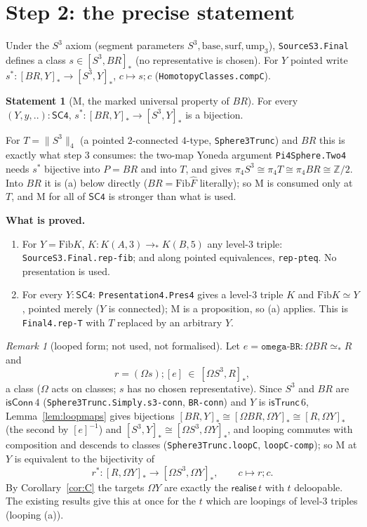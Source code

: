 \documentclass[11pt]{amsart}
\theoremstyle{definition}
\newtheorem{statement}[theorem]{Statement}
\theoremstyle{remark}
\newtheorem{remark}[theorem]{Remark}
\newcommand{\Om}{\Omega}
\newcommand{\code}[1]{\texttt{#1}}
\newcommand{\cT}{\mathsf{isTrunc}}
\newcommand{\cC}{\mathsf{isConn}}
\newcommand{\Fib}{\mathrm{Fib}}
\newcommand{\tr}[1]{\|#1\|}
\newcommand{\SCf}{\mathsf{SC4}}
\newcommand{\real}{\mathsf{realise}}
\newcommand{\pteq}{\simeq_*}
\newcommand{\Z}{\mathbb{Z}}
\begin{document}
\section{Step 2: the precise statement}

Under the $S^3$ axiom (segment parameters $S^3,\mathrm{base},\mathrm{surf},
\mathrm{ump}_3$), \code{SourceS3.Final} defines a class
$s\in[S^3,BR]_*$ (no representative is chosen). For $Y$ pointed write
$s^*:[BR,Y]_*\to[S^3,Y]_*$, $c\mapsto s;c$ (\code{HomotopyClasses.compC}).

\begin{statement}[M, the marked universal property of $BR$]
For every $(Y,y,..):\SCf$, $s^*:[BR,Y]_*\to[S^3,Y]_*$ is a bijection.
\end{statement}

\noindent For $T=\tr{S^3}_4$ (a pointed $2$-connected $4$-type,
\code{Sphere3Trunc}) and $BR$ this is exactly what step 3 consumes: the
two-map Yoneda argument \code{Pi4Sphere.Two4} needs $s^*$ bijective into
$P=BR$ and into $T$, and gives $\pi_4S^3\cong\pi_4T\cong\pi_4BR\cong\Z/2$. Into
$BR$ it is (a) below directly ($BR=\Fib\hat F$ literally); so M is consumed only
at $T$, and M for all of $\SCf$ is stronger than what is used.

\noindent\textbf{What is proved.}
\begin{enumerate}
\item[(a)] For $Y=\Fib K$, $K:K(A,3)\to_*K(B,5)$ any level-$3$ triple:
  \code{SourceS3.Final.rep-fib}; and along pointed equivalences,
  \code{rep-pteq}. No presentation is used.
\item[(b)] For every $Y:\SCf$: \code{Presentation4.Pres4} gives a level-$3$
  triple $K$ and $\Fib K\simeq Y$, pointed merely ($Y$ is connected); M is a
  proposition, so (a) applies. This is \code{Final4.rep-T} with $T$ replaced by
  an arbitrary $Y$.
\end{enumerate}
\begin{remark}[looped form; not used, not formalised] Let $e=\code{omega-BR}:\Om BR\pteq R$ and
\[
  r=(\Om s);[e]\ \in\ [\Om S^3,R]_*,
\]
a class ($\Om$ acts on classes; $s$ has no chosen representative). Since
$S^3$ and $BR$ are $\cC\,4$ (\code{Sphere3Trunc.Simply.s3-conn}, \code{BR-conn})
and $Y$ is $\cT\,6$, Lemma~\ref{lem:loopmaps} gives
bijections $[BR,Y]_*\cong[\Om BR,\Om Y]_*\cong[R,\Om Y]_*$ (the second by
$[e]^{-1}$) and $[S^3,Y]_*\cong[\Om S^3,\Om Y]_*$, and looping commutes with
composition and descends to classes (\code{Sphere3Trunc.loopC}, \code{loopC-comp}); so M at $Y$ is equivalent to the bijectivity of
\[
  r^*:[R,\Om Y]_*\longrightarrow[\Om S^3,\Om Y]_*,\qquad c\mapsto r;c .
\]
By Corollary~\ref{cor:C} the targets $\Om Y$ are exactly the $\real\,t$ with
$t$ deloopable. The existing results give this at once for the $t$ which are
loopings of level-$3$ triples (looping (a)).
\end{remark}
\end{document}
